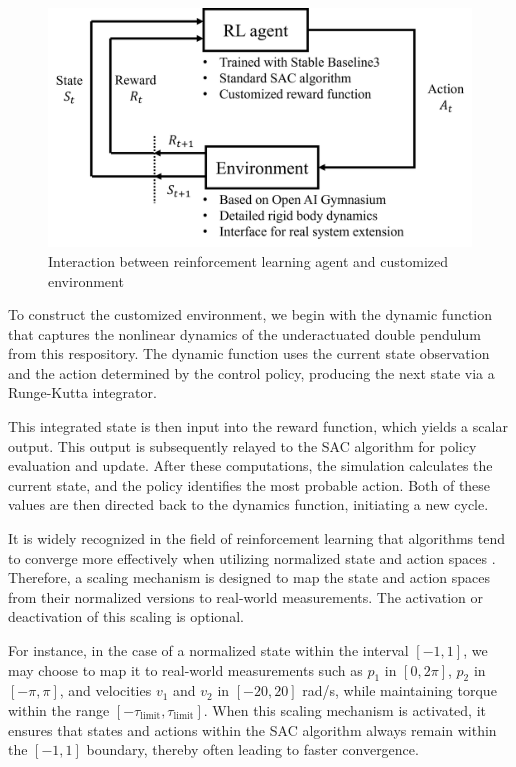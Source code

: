 \begin{figure}[htbp]
    \centering
    \includegraphics[width=0.8\linewidth]{figures/simulation_result/RL_interaction.png}
    \caption{Interaction between reinforcement learning agent and customized environment}
    \label{fig:RL_interaction}
\end{figure}

To construct the customized environment, we begin with the dynamic function that captures the nonlinear dynamics of the underactuated double pendulum from this respository\cite{2023_ram_wiebe_double_pendulum}. The dynamic function uses the current state observation and the action determined by the control policy, producing the next state via a Runge-Kutta integrator.

This integrated state is then input into the reward function, which yields a scalar output. This output is subsequently relayed to the SAC algorithm for policy evaluation and update. After these computations, the simulation calculates the current state, and the policy identifies the most probable action. Both of these values are then directed back to the dynamics function, initiating a new cycle.

It is widely recognized in the field of reinforcement learning that algorithms tend to converge more effectively when utilizing normalized state and action spaces \cite{sutton2018reinforcement}. Therefore, a scaling mechanism is designed to map the state and action spaces from their normalized versions to real-world measurements. The activation or deactivation of this scaling is optional.

For instance, in the case of a normalized state within the interval $[-1,1]$, we may choose to map it to real-world measurements such as $p_1$ in $[0,2\pi]$, $p_2$ in $[-\pi,\pi]$, and velocities $v_1$ and $v_2$ in $[-20,20]$ rad/s, while maintaining torque within the range $[-\tau_{\text{limit}}, \tau_{\text{limit}}]$. When this scaling mechanism is activated, it ensures that states and actions within the SAC algorithm always remain within the $[-1,1]$ boundary, thereby often leading to faster convergence.

